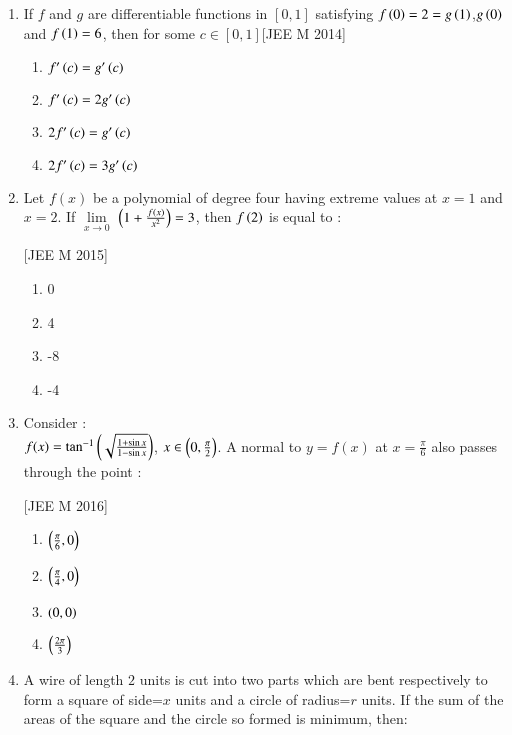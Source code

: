 \documentclass[journal,12pt,twocolumn]{IEEEtran}
\theoremstyle{remark}
\begin{document}
\begin{enumerate}
\begin{enumerate}
\end{enumerate}

\item If $f$ and $g$ are differentiable functions in ${[0,1]}$ satisfying $f\left(0\right)=2=g\left(1\right)$,$g\left(0\right)$ and $f\left(1\right)=6$, then for some $c\in {[0,1]}$\hfill[JEE M 2014]
\begin{enumerate}
    \item  $f'\left(c\right)=g'\left(c\right)$\\
    \item  $f'\left(c\right)=2g'\left(c\right)$\\
    \item  $2f'\left(c\right)=g'\left(c\right)$\\
    \item  $2f'\left(c\right)=3g'\left(c\right)$\\
\end{enumerate}
\item Let $f(x)$ be a polynomial of degree four having extreme values at $x=1$ and $x=2$. If $\lim\limits_{x\to 0}$ $\left(1+\frac{f(x)}{x^{2}}\right)=3$, then $f\left(2\right)$ is equal to :

    \hfill[JEE M 2015]\\
\begin{enumerate}
    \item  0\\
    \item  4\\
    \item -8\\
    \item -4\\
\end{enumerate}    
\item Consider $:$\\
     $f(x)=\tan^{-1}\left( \sqrt{\frac{1+\sin{x}}{1-\sin{x}} }\right)$, $x \in \left(0, \frac{\pi}{2}\right)$. 
A normal to $y=f(x)$ at $x=\frac{\pi}{6}$ also passes through the point :

\hfill[JEE M 2016]\\
\begin{enumerate}
    \item  $\left(\frac{\pi}{6},0\right)$\\
    \item  $\left(\frac{\pi}{4},0\right)$\\
    \item  $\left(0,0\right)$\\
    \item  $\left(\frac{2\pi}{3}\right)$\\
\end{enumerate}
\item A wire of length $2$ units is cut into two parts which are bent respectively to form a square of side=$x$ units and a circle of radius=$r$ units. If the sum of the areas of the square and the circle so formed is minimum, then:


\end{enumerate}
\end{document}

